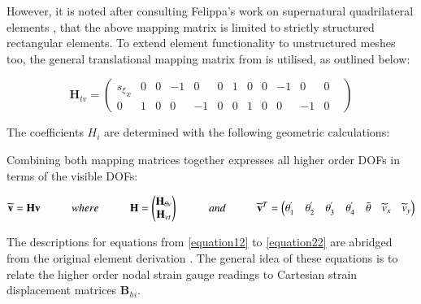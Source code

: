 However, it is noted after consulting Felippa's work on supernatural quadrilateral elements \cite{felippa2006supernatural}, that the above mapping matrix is limited to strictly structured rectangular elements. To extend element functionality to unstructured meshes too, the general translational mapping matrix from \cite{felippa2006supernatural} is utilised, as outlined below:

\begin{equation} 
\mathbf{H}_{tv} =
\begin{pmatrix}
{s_\xi}_x & 0 & 0 & -1 & 0 & 0 & 1 & 0 & 0 & -1 & 0 & 0 \\
0 & 1 & 0 & 0 & -1 & 0 & 0 & 1 & 0 & 0 & -1 & 0 & 
\end{pmatrix}
\label{equation10_1}
\end{equation}

The coefficients $H_i$ are determined with the following geometric calculations:



Combining both mapping matrices together expresses all higher order DOFs in terms of the visible DOFs:

\begin{equation} 
\widetilde{\mathbf{v}} = \mathbf{H v}
\hspace{10mm}
where
\hspace{10mm}
\mathbf{H} =
\begin{pmatrix}
\mathbf{H}_{\theta v} \\
\mathbf{H}_{vt}
\end{pmatrix}
\hspace{10mm}
and
\hspace{10mm}
\widetilde{\mathbf{v}}^T = 
\begin{pmatrix}
\theta_1^{'} & \theta_2^{'} & \theta_3^{'} & \theta_4^{'} & \bar{\theta} &  \widetilde{v}_x & \widetilde{v}_y
\end{pmatrix}
\label{equation11}
\end{equation}

The descriptions for equations from \eqref{equation12} to \eqref{equation22} are abridged from the original element derivation \cite{Hau94}. The general idea of these equations is to relate the higher order nodal strain gauge readings to Cartesian strain displacement matrices $\mathbf{B}_{hi}$.

